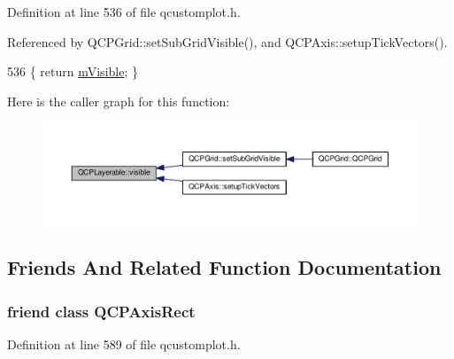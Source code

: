 Definition at line 536 of file qcustomplot.\+h.



Referenced by Q\+C\+P\+Grid\+::set\+Sub\+Grid\+Visible(), and Q\+C\+P\+Axis\+::setup\+Tick\+Vectors().


\begin{DoxyCode}
536 \{ \textcolor{keywordflow}{return} \hyperlink{class_q_c_p_layerable_a62e3aed8427d6ce3ccf716f285106cb3}{mVisible}; \}
\end{DoxyCode}


Here is the caller graph for this function\+:\nopagebreak
\begin{figure}[H]
\begin{center}
\leavevmode
\includegraphics[width=350pt]{class_q_c_p_layerable_a10a3cc92e0fa63e4a929e61d34e275a7_icgraph}
\end{center}
\end{figure}




\subsection{Friends And Related Function Documentation}
\hypertarget{class_q_c_p_layerable_acbf20ecb140f66c5fd1bc64ae0762990}{}
\subsubsection[{Q\+C\+P\+Axis\+Rect}]{\setlength{\rightskip}{0pt plus 5cm}friend class {\bf Q\+C\+P\+Axis\+Rect}\hspace{0.3cm}{\ttfamily [friend]}}\label{class_q_c_p_layerable_acbf20ecb140f66c5fd1bc64ae0762990}


Definition at line 589 of file qcustomplot.\+h.

\hypertarget{class_q_c_p_layerable_a1cdf9df76adcfae45261690aa0ca2198}{}
